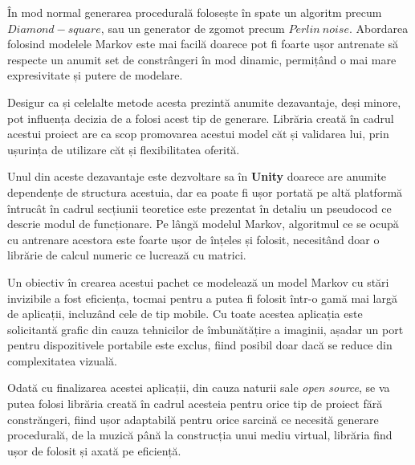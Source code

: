 În mod normal generarea procedurală folosește în spate un algoritm precum $Diamond-square$, sau un generator de zgomot precum $Perlin \ noise$. Abordarea folosind modelele Markov este mai facilă doarece pot fi foarte ușor antrenate să respecte un anumit set de constrângeri în mod dinamic, permițând o mai mare expresivitate și putere de modelare. \par

Desigur ca și celelalte metode acesta prezintă anumite dezavantaje, deși minore, pot influența decizia de a folosi acest tip de generare. Librăria creată în cadrul acestui proiect are ca scop promovarea acestui model căt și validarea lui, prin ușurința de utilizare căt și flexibilitatea oferită.\par

Unul din aceste dezavantaje este dezvoltare sa în \textbf{Unity} doarece are anumite dependențe de structura acestuia, dar ea poate fi ușor portată pe altă platformă întrucât în cadrul secțiunii teoretice este prezentat în detaliu un pseudocod ce descrie modul de funcționare. Pe lângă modelul Markov, algoritmul ce se ocupă cu antrenare acestora este foarte ușor de înțeles și folosit, necesitând doar o librărie de calcul numeric ce lucrează cu matrici.\par  

Un obiectiv în crearea acestui pachet ce modelează un model Markov cu stări invizibile a fost eficiența, tocmai pentru a putea fi folosit într-o gamă mai largă de aplicații, incluzând cele de tip mobile. Cu toate acestea aplicația este solicitantă grafic din cauza tehnicilor de îmbunătățire a imaginii, așadar un port pentru dispozitivele portabile este exclus, fiind posibil doar dacă se reduce din complexitatea vizuală.\par

Odată cu finalizarea acestei aplicații, din cauza naturii sale \textit{open source}, se va putea folosi librăria creată în cadrul acesteia pentru orice tip de proiect fără constrăngeri, fiind ușor adaptabilă pentru orice sarcină ce necesită generare procedurală, de la muzică până la construcția unui mediu virtual, librăria find ușor de folosit și axată pe eficiență.\par

